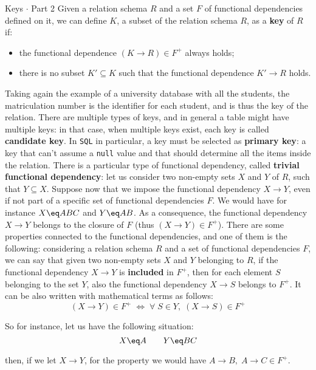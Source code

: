 \begin{definition}{Keys $\cdot$ Part 2}
    Given a relation schema $R$ and a set $F$ of functional dependencies defined on it, we can define $K$, a subset of the relation schema $R$, as a \textbf{key} of $R$ if:
    \begin{itemize}
        \item [1)] the functional dependence $(K \rightarrow R) \in F^+$ always holds;
        \item [2)] there is no subset $K' \subseteq K$ such that the functional dependence $K' \rightarrow R$ holds.
    \end{itemize}
\end{definition}

Taking again the example of a university database with all the students, the matriculation number is the identifier for each student, and is thus the key of the relation. There are multiple types of keys, and in general a table might have multiple keys: in that case, when multiple keys exist, each key is called \textbf{candidate key}. In \texttt{SQL} in particular, a key must be selected as \textbf{primary key}: a key that can't assume a \texttt{null} value and that should determine all the items inside the relation.
\nwl
There is a particular type of functional dependency, called \textbf{trivial functional dependency}: let us consider two non-empty sets $X$ and $Y$ of $R$, such that $Y \subseteq X$. Suppose now that we impose the functional dependency $X \rightarrow Y$, even if not part of a specific set of functional dependencies $F$. We would have for instance $X \eq ABC$ and $Y \eq AB$. As a consequence, the functional dependency $X \rightarrow Y$ belongs to the closure of $F$ (thus $(X \rightarrow Y) \in F^+$).
\nwl
There are some properties connected to the functional dependencies, and one of them is the following: considering a relation schema $R$ and a set of functional dependencies $F$, we can say that given two non-empty sets $X$ and $Y$ belonging to $R$, if the functional dependency $X \rightarrow Y$ is \textbf{included} in $F^+$, then for each element $S$ belonging to the set $Y$, also the functional dependency $X \rightarrow S$ belongs to $F^+$. It can be also written with mathematical terms as follows:
\[ (X \rightarrow Y) \in F^+ \; \Longleftrightarrow \; \forall \; S \in Y, \; (X \rightarrow S) \in F^+ \]

So for instance, let us have the following situation:
\[ X \eq A \quad \quad Y \eq BC \]

then, if we let $X \rightarrow Y$, for the property we would have ${A \rightarrow B, \; A \rightarrow C} \in F^+$.

